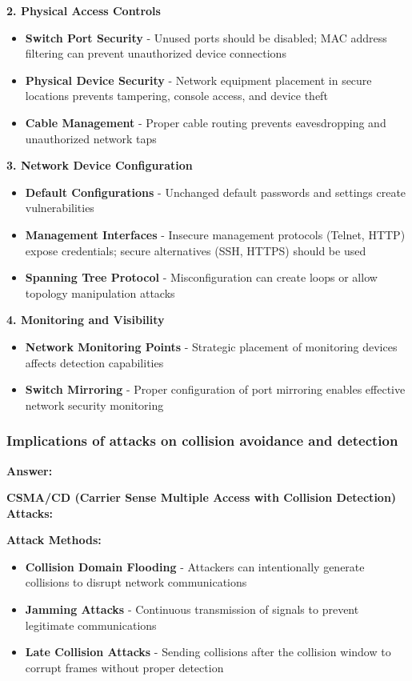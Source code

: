 \documentclass[12pt,a4paper]{article}
\begin{document}
\textbf{2. Physical Access Controls}
\begin{itemize}
    \item \textbf{Switch Port Security} - Unused ports should be disabled; MAC address filtering can prevent unauthorized device connections
    \item \textbf{Physical Device Security} - Network equipment placement in secure locations prevents tampering, console access, and device theft
    \item \textbf{Cable Management} - Proper cable routing prevents eavesdropping and unauthorized network taps
\end{itemize}

\textbf{3. Network Device Configuration}
\begin{itemize}
    \item \textbf{Default Configurations} - Unchanged default passwords and settings create vulnerabilities
    \item \textbf{Management Interfaces} - Insecure management protocols (Telnet, HTTP) expose credentials; secure alternatives (SSH, HTTPS) should be used
    \item \textbf{Spanning Tree Protocol} - Misconfiguration can create loops or allow topology manipulation attacks
\end{itemize}

\textbf{4. Monitoring and Visibility}
\begin{itemize}
    \item \textbf{Network Monitoring Points} - Strategic placement of monitoring devices affects detection capabilities
    \item \textbf{Switch Mirroring} - Proper configuration of port mirroring enables effective network security monitoring
\end{itemize}

\subsubsection{Implications of attacks on collision avoidance and detection}

\textbf{Answer:}

\textbf{CSMA/CD (Carrier Sense Multiple Access with Collision Detection) Attacks:}

\textbf{Attack Methods:}
\begin{itemize}
    \item \textbf{Collision Domain Flooding} - Attackers can intentionally generate collisions to disrupt network communications
    \item \textbf{Jamming Attacks} - Continuous transmission of signals to prevent legitimate communications
    \item \textbf{Late Collision Attacks} - Sending collisions after the collision window to corrupt frames without proper detection
\end{itemize}
\end{document}
